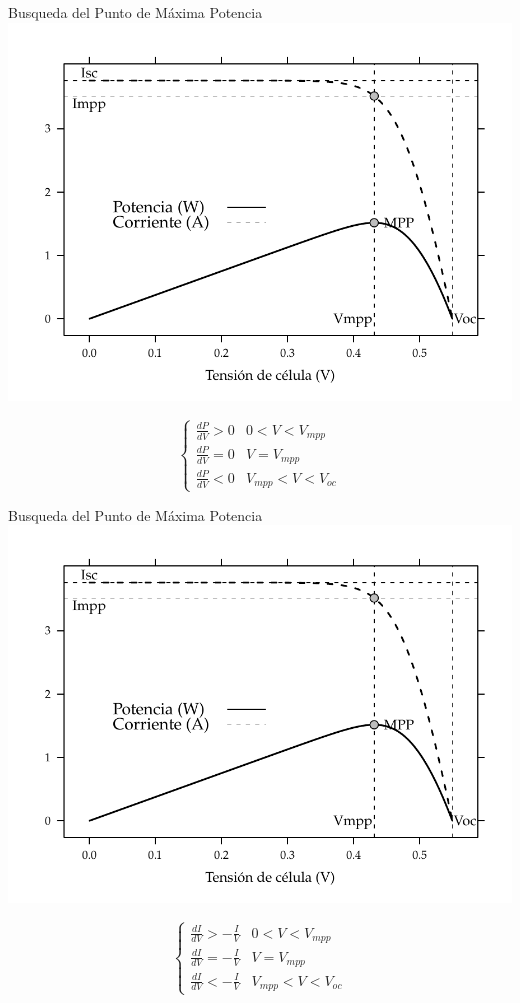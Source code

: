 \documentclass[xcolor={usenames,svgnames,dvipsnames}]{beamer}
\begin{document}
\begin{frame}[label=sec-2-5-2]{Busqueda del Punto de Máxima Potencia}
\includegraphics[height=0.6\textheight]{../figs/CurvaIV_Ta20_G800.pdf}

$$\begin{cases}
      \frac{dP}{dV}>0 & 0<V<V_{mpp}\\
      \frac{dP}{dV}=0 & V=V_{mpp}\\
      \frac{dP}{dV}<0 & V_{mpp}<V<V_{oc}\end{cases}$$
\end{frame}

\begin{frame}[label=sec-2-5-3]{Busqueda del Punto de Máxima Potencia}
\includegraphics[height=0.6\textheight]{../figs/CurvaIV_Ta20_G800.pdf}

$$\begin{cases}
      \frac{dI}{dV}>-\frac{I}{V} & 0<V<V_{mpp}\\
      \frac{dI}{dV}=-\frac{I}{V} & V=V_{mpp}\\
      \frac{dI}{dV}<-\frac{I}{V} & V_{mpp}<V<V_{oc}\end{cases}$$
\end{frame}
\end{document}
